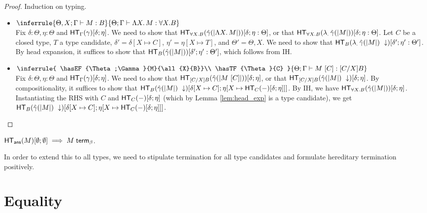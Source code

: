 \documentclass{article}
\begin{document}
\begin{proof}
Induction on typing.
\begin{itemize}
\setlength\itemsep{1em}
\item $\inferrule{
  \hasEF{\Theta, X; \Gamma}{M}{B}
  }{
  \hasEF{\Theta; \Gamma}{\tlam{X}{M}}{\all{X}{B}}
  }$\\
Fix $\delta : \Theta, \eta : \Theta$ and $\mathsf{HT}_{\Gamma}(\gamma)[\delta;\eta]$. We need to show that 
$\mathsf{HT}_{\forall X. B}(\hat\gamma(|\Lambda X.\, M|))[\delta;\eta : \Theta]$, or that
$\mathsf{HT}_{\forall X. B}(\lambda _.\, \hat\gamma(|M|))[\delta;\eta : \Theta]$.
Let $C$ be a closed type, $T$ a type candidate, 
$\delta' = \delta[X \mapsto C]$, $\eta' = \eta[X \mapsto T]$, and $\Theta' = \Theta,X$. 
We need to show that $\mathsf{HT}_{B}(\lambda _.\, \hat\gamma(|M|)\ \downarrow)[\delta';\eta' : \Theta']$. 
By head expansion, it suffices to show
that $\mathsf{HT}_{B}(\hat\gamma(|M|))[\delta';\eta' : \Theta']$, which follows from IH. 

\item $\inferrule{
  \hasEF{\Theta;\Gamma}{M}{\all{X}{B}}\\
  \hasTF{\Theta}{C}
  }{
  \hasEF{\Theta;\Gamma}{\tap{M}{C}}{[C/X]B}
  }$\\
Fix $\delta : \Theta, \eta : \Theta$ and $\mathsf{HT}_{\Gamma}(\gamma)[\delta;\eta]$. We need to show that 
$\mathsf{HT}_{[C/X]B}(\hat\gamma(|M\ [C]|))[\delta;\eta]$, or that
$\mathsf{HT}_{[C/X]B}(\hat\gamma(|M|)\ \downarrow)[\delta;\eta]$. By compositionality, it suffices to show that
$\mathsf{HT}_{B}(\hat\gamma(|M|)\ \downarrow)[\delta[X \mapsto C];\eta[X \mapsto \mathsf{HT}_{C}(-)[\delta;\eta]]]$.
By IH, we have $\mathsf{HT}_{\forall X. B}(\hat\gamma(|M|))[\delta;\eta]$. Instantiating the RHS with $C$ and 
$\mathsf{HT}_{C}(-)[\delta;\eta]$ (which by Lemma \ref{lem:head_exp} is a type candidate), we get
$\mathsf{HT}_{B}(\hat\gamma(|M|)\ \downarrow)[\delta[X \mapsto C];\eta[X \mapsto \mathsf{HT}_{C}(-)[\delta;\eta]]]$.
\end{itemize}
\end{proof}

\begin{corollary}
$\mathsf{HT}_{\mathsf{ans}}(M)[\emptyset;\emptyset] \implies {M} \; \mathsf{term}_{\beta}$.
\end{corollary}

In order to extend this to all types, we need to stipulate termination for all type candidates and formulate hereditary
termination positively. 

\section{Equality}
\end{document}
